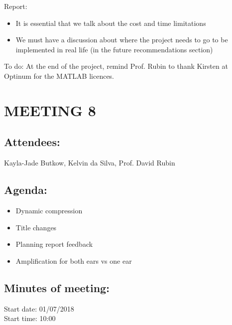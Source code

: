 \documentclass[10pt,onecolumn]{witseiepaper}
\begin{document}
Report:
\begin{itemize}
	\item It is essential that we talk about the cost and time limitations
	\item We must have a discussion about where the project needs to go to be implemented in real life (in the future recommendations section)
\end{itemize}

To do:
At the end of the project, remind Prof. Rubin to thank Kirsten at Optinum for the MATLAB licences.

\section*{MEETING 8}
\subsection*{Attendees:}
Kayla-Jade Butkow, Kelvin da Silva, Prof. David Rubin
\subsection*{Agenda:} 
\begin{itemize}
	\item Dynamic compression
	\item Title changes
	\item Planning report feedback
	\item Amplification for both ears vs one ear
\end{itemize}

\subsection*{Minutes of meeting:}
Start date: 01/07/2018 \\
Start time: 10:00
\end{document}

